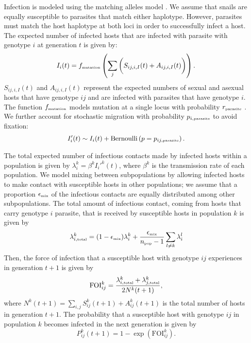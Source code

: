 \documentclass{article}\usepackage[]{graphicx}\usepackage[]{color}
\begin{document}
Infection is modeled using the matching alleles model \citep{otto1998evolution}.
We assume that snails are equally susceptible to parasites that match either haplotype.
However, parasites must match the host haplotype at both loci in order to successfully infect a host.
The expected number of infected hosts that are infected with parasite with genotype $i$ at generation $t$ is given by:
\begin{equation}
I_{i}(t) = f_{\textrm{\tiny mutation}} \left( \sum_{j}  \bigg( S_{ij,i,I}(t) + A_{ij,i,I}(t)\bigg)\right).
\end{equation}
$S_{ij,i,I}(t)$ and $A_{ij,i,I}(t)$ represent the expected numbers of sexual and asexual hosts that have genotype $ij$ and are infected with parasites that have genotype $i$.
The function $f_{\textrm{\tiny mutation}}$ models mutation at a single locus with probability $r_{\textrm{\tiny parasite}}$ \citep{ashby2015diversity}. 
We further account for stochastic migration with probability $p_{i, \textrm{\tiny parasite}}$ to avoid fixation:
\begin{equation}
I_{i}'(t) \sim I_i(t) + \mathrm{Bernoulli}\left(p=p_{ij, \textrm{\tiny parasite}}\right).
\end{equation}

The total expected number of infectious contacts made by infected hosts within a population is given by $\lambda_i^k = \beta^k {I_i'}^k(t)$, where $\beta^k$ is the transmission rate of each population. 
We model mixing between subpopulations by allowing infected hosts to make contact with susceptible hosts in other populations;
we assume that a proportion $\epsilon_{\textrm{\tiny mix}}$ of the infectious contacts are equally distributed among other subpopulations.
The total amount of infectious contact, coming from hosts that carry genotype $i$ parasite, that is received by susceptible hosts in population $k$ is given by
\begin{equation}
\lambda_{i, \textrm{\tiny total}}^k = (1 - \epsilon_{\textrm{\tiny mix}}) \lambda_i^k + \frac{\epsilon_{\textrm{\tiny mix}}}{n_\textrm{\tiny pop}-1} \sum_{l \neq k} \lambda_i^l
\end{equation}
Then, the force of infection that a susceptible host with genotype $ij$ experiences in generation $t+1$ is given by
\begin{equation}
\mathrm{FOI}_{ij}^k = \frac{\lambda_{i, \textrm{\tiny total}}^k  + \lambda_{j, \textrm{\tiny total}}^k}{2 N^k(t+1)},
\end{equation}
where $N^k(t+1) = \sum_{i,j} S_{ij}^k(t+1) + A_{ij}^k(t+1)$ is the total number of hosts in generation $t+1$.
The probability that a susceptible host with genotype $ij$ in population $k$ becomes infected in the next generation is given by
\begin{equation}
P_{ij}^k(t+1) = 1 - \exp\left(\mathrm{FOI}_{ij}^k\right).
\end{equation}
\end{document}
